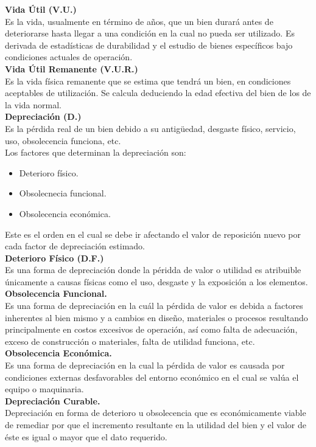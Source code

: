\textbf{Vida Útil (V.U.)} \\ 
Es la vida, usualmente en término de años, que un bien durará antes de deteriorarse hasta llegar a una condición en la cual no pueda ser utilizado.
Es derivada de estadísticas de durabilidad y el estudio de bienes específicos bajo condiciones actuales de operación. \\[6mm] 
\textbf{Vida Útil Remanente (V.U.R.)} \\ 
Es la vida física remanente que se estima que tendrá un bien, en condiciones aceptables de utilización.
Se calcula deduciendo la edad efectiva del bien de los de la vida normal. \\[6mm] 
\textbf{Depreciación (D.)} \\ 
Es la pérdida real de un bien debido a su antigüedad, desgaste físico, servicio, uso, obsolecencia funciona, etc. \\ 
Los factores que determinan la depreciación son:
\begin{itemize}
	\item Deterioro físico.
	\item Obsolecnecia funcional.
	\item Obsolecencia económica.
\end{itemize}
Este es el orden en el cual se debe ir afectando el valor de reposición nuevo por cada factor de depreciación estimado. \\[6mm] 
\textbf{Deterioro Físico  (D.F.)} \\ 
Es una forma de depreciación donde la péridda de valor o utilidad es atribuible únicamente a causas físicas como el uso, desgaste y la exposición a los elementos. \\[6mm] 
\textbf{Obsolecencia Funcional.} \\ 
Es una forma de depreciación en la cuál la pérdida de valor es debida a factores inherentes al bien mismo y a cambios en diseño, materiales o procesos resultando principalmente en costos excesivos de operación, así como falta de adecuación, exceso de construcción o materiales, falta de utilidad funciona, etc. \\[6mm] 
\textbf{Obsolecencia Económica.} \\ 
Es una forma de depreciación en la cual la pérdida de valor es causada por condiciones externas desfavorables del entorno económico en el cual se valúa el equipo o maquinaria. \\[6mm] 
\textbf{Depreciación Curable.} \\ 
Depreciación en forma de deterioro u obsolecencia que es económicamente viable de remediar por que el incremento resultante en la utilidad del bien y el valor de éste es igual o mayor que el dato requerido. \\[6mm] 
